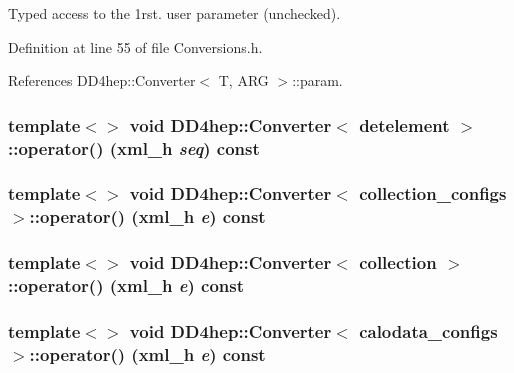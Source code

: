 Typed access to the 1rst. user parameter (unchecked). 

Definition at line 55 of file Conversions.h.

References DD4hep::Converter$<$ T, ARG $>$::param.\hypertarget{struct_d_d4hep_1_1_converter_a32541c316bf853ed606f586d56bc5597}{
\subsubsection[{operator()}]{\setlength{\rightskip}{0pt plus 5cm}template$<$$>$ void {\bf DD4hep::Converter}$<$ detelement $>$::operator() ({\bf xml\_\-h} {\em seq}) const}}
\label{struct_d_d4hep_1_1_converter_a32541c316bf853ed606f586d56bc5597}
\hypertarget{struct_d_d4hep_1_1_converter_a08c0d7669b5fa73c187be97bd8c1b709}{
\subsubsection[{operator()}]{\setlength{\rightskip}{0pt plus 5cm}template$<$$>$ void {\bf DD4hep::Converter}$<$ collection\_\-configs $>$::operator() ({\bf xml\_\-h} {\em e}) const}}
\label{struct_d_d4hep_1_1_converter_a08c0d7669b5fa73c187be97bd8c1b709}
\hypertarget{struct_d_d4hep_1_1_converter_a8753edb2d4ce141f26316a8268381450}{
\subsubsection[{operator()}]{\setlength{\rightskip}{0pt plus 5cm}template$<$$>$ void {\bf DD4hep::Converter}$<$ collection $>$::operator() ({\bf xml\_\-h} {\em e}) const}}
\label{struct_d_d4hep_1_1_converter_a8753edb2d4ce141f26316a8268381450}
\hypertarget{struct_d_d4hep_1_1_converter_a8dc46a004a139a5a5d924fea83230135}{
\subsubsection[{operator()}]{\setlength{\rightskip}{0pt plus 5cm}template$<$$>$ void {\bf DD4hep::Converter}$<$ calodata\_\-configs $>$::operator() ({\bf xml\_\-h} {\em e}) const}}
